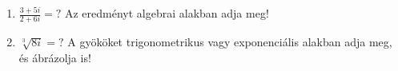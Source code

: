 \documentclass[11pt]{scrartcl}
\begin{document}
\begin{enumerate}
	\item \(\displaystyle
	      \frac{3 + 5i}{2 + 6i} = ?
	      \) Az eredményt algebrai alakban adja meg!

	\item $\sqrt[3]{8i} = ?$ A gyököket trigonometrikus vagy exponenciális alakban
	      adja meg, és ábrázolja is!
\end{enumerate}
\end{document}
